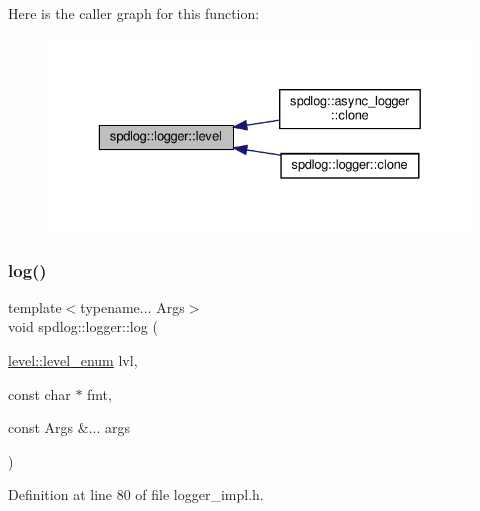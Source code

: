 Here is the caller graph for this function\+:
\nopagebreak
\begin{figure}[H]
\begin{center}
\leavevmode
\includegraphics[width=329pt]{classspdlog_1_1logger_a20dc8198d08c98f84ae10be635108bef_icgraph}
\end{center}
\end{figure}
\mbox{\label{classspdlog_1_1logger_a1e4b2c515490efb5456665a9a64382d9}} 
\subsubsection{\texorpdfstring{log()}{log()}\hspace{0.1cm}{\footnotesize\ttfamily [1/8]}}
{\footnotesize\ttfamily template$<$typename... Args$>$ \\
void spdlog\+::logger\+::log (\begin{DoxyParamCaption}\item[{\hyperlink{namespacespdlog_1_1level_a35f5227e5daf228d28a207b7b2aefc8b}{level\+::level\+\_\+enum}}]{lvl,  }\item[{const char $\ast$}]{fmt,  }\item[{const Args \&...}]{args }\end{DoxyParamCaption})\hspace{0.3cm}{\ttfamily [inline]}}



Definition at line 80 of file logger\+\_\+impl.\+h.

